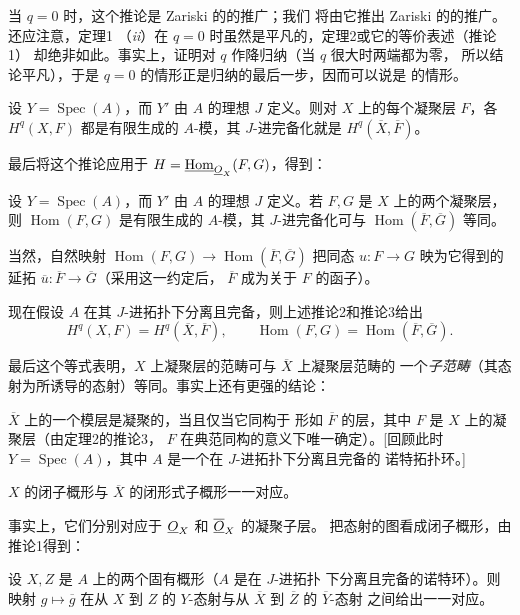 当 $q=0$ 时，这个推论是 Zariski 的的推广；我们
将由它推出 Zariski 的的推广。还应注意，定理1
（\textit{ii}）在 $q=0$ 时虽然是平凡的，定理2或它的等价表述（推论1）
却绝非如此。事实上，证明对 $q$ 作降归纳（当 $q$ 很大时两端都为零，
所以结论平凡），于是 $q=0$ 的情形正是归纳的最后一步，因而可以说是
的情形。

 设 $Y=\operatorname{Spec}(A)$，而 $Y'$ 由 $A$ 的理想
$J$ 定义。则对 $X$ 上的每个凝聚层 $F$，各 $H^{q}(X,F)$ 都是有限生成的
$A$-模，其 $J$-进完备化就是 $H^{q}(\overline X,\overline F)$。

最后将这个推论应用于
$H=\underline{\operatorname{Hom}}_{\underline{O}_X}(F,G)$，得到：

 设 $Y=\operatorname{Spec}(A)$，而 $Y'$ 由 $A$ 的理想
$J$ 定义。若 $F,G$ 是 $X$ 上的两个凝聚层，则
$\operatorname{Hom}(F,G)$ 是有限生成的 $A$-模，其 $J$-进完备化可与
$\operatorname{Hom}(\overline F,\overline G)$ 等同。

当然，自然映射
$\operatorname{Hom}(F,G)\longrightarrow
\operatorname{Hom}(\overline F,\overline G)$ 把同态
$u:F\longrightarrow G$ 映为它得到的延拓
$\overline u:\overline F\longrightarrow\overline G$（采用这一约定后，
$\overline F$ 成为关于 $F$ 的函子）。

现在假设 $A$ 在其 $J$-进拓扑下分离且完备，则上述推论2和推论3给出
\[
  H^{q}(X,F)=H^{q}(\overline X,\overline F),
  \qquad
  \operatorname{Hom}(F,G)
  =\operatorname{Hom}(\overline F,\overline G).
\]

最后这个等式表明，$X$ 上凝聚层的范畴可与 $\overline X$ 上凝聚层范畴的
一个\emph{子范畴}（其态射为所诱导的态射）等同。事实上还有更强的结论：

 $\overline X$ 上的一个模层是凝聚的，当且仅当它同构于
形如 $\overline F$ 的层，其中 $F$ 是 $X$ 上的凝聚层（由定理2的推论3，
$F$ 在典范同构的意义下唯一确定）。[回顾此时
$Y=\operatorname{Spec}(A)$，其中 $A$ 是一个在 $J$-进拓扑下分离且完备的
诺特拓扑环。]

 $X$ 的闭子概形与 $\overline X$ 的闭形式子概形一一对应。

事实上，它们分别对应于 $\underline{O}_X$ 和 $\overline{\underline{O}}_X$ 的凝聚子层。
把态射的图看成闭子概形，由推论1得到：

 设 $X,Z$ 是 $A$ 上的两个固有概形（$A$ 是在 $J$-进拓扑
下分离且完备的诺特环）。则映射 $g\longmapsto\overline g$ 在从 $X$ 到
$Z$ 的 $Y$-态射与从 $\overline X$ 到 $\overline Z$ 的 $\overline Y$-态射
之间给出一一对应。

